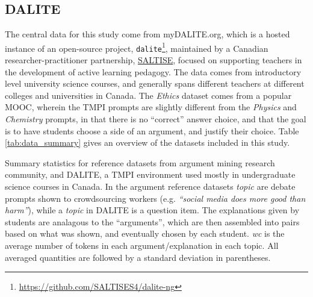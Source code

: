 \documentclass[notitlepage,12pt]{jedm}
\begin{document}
\subsection{DALITE}\label{sec:dataset_dalite}
The central data for this study come from myDALITE.org, which is a hosted 
instance of an open-source project, 
\verb|dalite|\footnote{\url{https://github.com/SALTISES4/dalite-ng}}, 
maintained by a Canadian researcher-practitioner partnership, 
\href{saltise.ca}{SALTISE}, focused on supporting teachers in the development 
of active learning pedagogy.
The data comes from introductory level university science courses, and 
generally spans different teachers at different colleges and universities in 
Canada. 
The \textit{Ethics} dataset comes from a popular MOOC, wherein the TMPI prompts 
are slightly different from the \textit{Physics} and \textit{Chemistry} 
prompts, in that there is no ``correct'' answer choice, and that the goal is to 
have students choose a side of an argument, and justify their choice.
Table \ref{tab:data_summary} gives an overview of the datasets included in this 
study.


\begin{table}
	
	\caption{
		Summary statistics for reference datasets from argument mining research 
		community, and DALITE, a TMPI environment used mostly in undergraduate 
		science courses in Canada. 
		In the argument reference datasets \textit{topic} are debate prompts 
		shown to crowdsourcing workers (e.g. \textit{``social media does more 
		good than harm''}), while a \textit{topic} in DALITE is a question item.
		The explanations given by students are analagous to the ``arguments'',  
		which are then assembled into pairs based on what was shown, and 
		eventually chosen by each student.
		\textit{wc} is the average number of tokens in each 
		argument/explanation in each topic.
		All averaged quantities are followed by a standard deviation in 
		parentheses.
	}
	\label{tab:data_summary}
\end{table}
\end{document}
